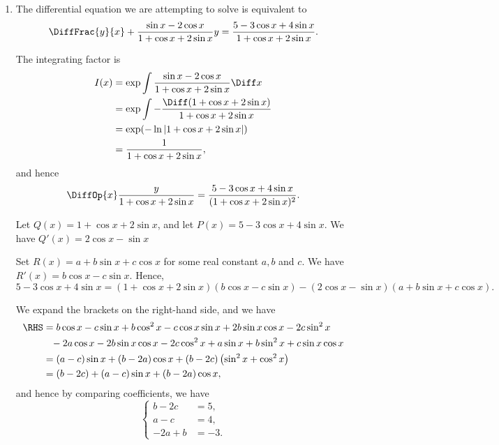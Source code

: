 \begin{enumerate}
    \item The differential equation we are attempting to solve is equivalent to
          \[
              \DiffFrac{y}{x} + \frac{\sin x - 2 \cos x}{1 + \cos x + 2 \sin x} y = \frac{5 - 3 \cos x + 4 \sin x}{1 + \cos x + 2 \sin x}.
          \]

          The integrating factor is
          \begin{align*}
              I(x) & = \exp \int \frac{\sin x - 2 \cos x}{1 + \cos x + 2 \sin x} \Diff x       \\
                   & = \exp \int - \frac{\Diff (1 + \cos x + 2 \sin x)}{1 + \cos x + 2 \sin x} \\
                   & = \exp (- \ln |1 + \cos x + 2 \sin x|)                                    \\
                   & = \frac{1}{1 + \cos x + 2 \sin x},
          \end{align*}
          and hence
          \[
              \DiffOp{x} \frac{y}{1 + \cos x + 2 \sin x} = \frac{5 - 3 \cos x + 4 \sin x}{(1 + \cos x + 2 \sin x)^2}.
          \]

          Let \(Q(x) = 1 + \cos x + 2 \sin x\), and let \(P(x) = 5 - 3 \cos x + 4 \sin x\). We have \(Q'(x) = 2 \cos x - \sin x\)

          Set \(R(x) = a + b \sin x + c \cos x\) for some real constant \(a, b\) and \(c\). We have \(R'(x) = b \cos x - c \sin x\). Hence,
          \[
              5 - 3 \cos x + 4 \sin x = (1 + \cos x + 2 \sin x)(b \cos x - c \sin x) - (2 \cos x - \sin x)(a + b \sin x + c \cos x).
          \]

          We expand the brackets on the right-hand side, and we have
          \begin{align*}
              \RHS & = b \cos x - c \sin x + b \cos^2 x - c \cos x \sin x + 2b \sin x \cos x - 2c \sin^2 x             \\
                   & \phantom{=} - 2a \cos x - 2b\sin x \cos x - 2c \cos^2 x + a \sin x + b \sin^2 x + c \sin x \cos x \\
                   & = (a - c) \sin x + (b - 2a) \cos x + (b - 2c) \left(\sin^2 x + \cos^2 x\right)                    \\
                   & = (b - 2c) + (a - c) \sin x + (b - 2a) \cos x,
          \end{align*}
          and hence by comparing coefficients, we have
          \[
              \left\{
              \begin{aligned}
                  b - 2c  & = 5,  \\
                  a - c   & = 4,  \\
                  -2a + b & = -3.
              \end{aligned}
              \right.
          \]


\end{enumerate}
